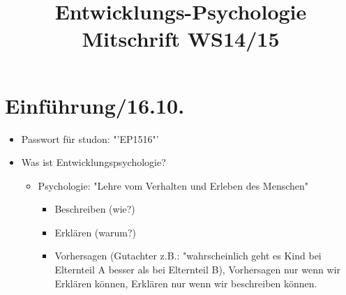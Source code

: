 \documentclass[a4paper]{scrartcl}
\title{Entwicklungs-Psychologie Mitschrift WS14/15}
\begin{document}
\maketitle
\tableofcontents
\newpage
\section{Einführung/16.10.}
\begin{itemize}
	\item
		Passwort für studon: "'EP1516"'
	\item
		Was ist Entwicklungspsychologie?
		\begin{itemize}
			\item
				Psychologie: "Lehre vom Verhalten und Erleben des Menschen"
				\begin{itemize}
					\item Beschreiben (wie?)
					\item Erklären (warum?)
					\item Vorhersagen (Gutachter z.B.: "wahrscheinlich geht es Kind bei Elternteil A besser als bei Elternteil B), Vorhersagen nur wenn wir Erklären können, Erklären nur wenn wir beschreiben können.


\end{itemize}
\end{itemize}
\end{itemize}
\end{document}
